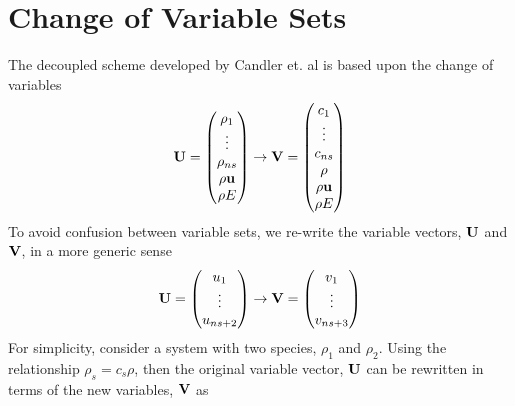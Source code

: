 \section{Change of Variable Sets}
\label{change-of-var-section}

The decoupled scheme developed by Candler et. al is based upon the change of
variables
\begin{equation}
  \mathbf U = \begin{pmatrix}
    \rho_1 \\
    \vdots \\
    \rho_{ns} \\
    \rho \mathbf u \\
    \rho E
  \end{pmatrix}
  \rightarrow
  \mathbf V = \begin{pmatrix}
    c_1 \\
    \vdots \\
    c_{ns} \\
    \rho \\
    \rho \mathbf u \\
    \rho E
  \end{pmatrix}
  \label{var-sets}
\end{equation}
To avoid confusion between variable sets, we re-write the variable vectors,
$\mathbf U$ and $\mathbf V$, in a more generic sense
\begin{equation}
  \mathbf U = \begin{pmatrix}
    u_1 \\
    \vdots \\
    u_{ns + 2}
  \end{pmatrix}
  \rightarrow
  \mathbf V = \begin{pmatrix}
    v_1 \\
    \vdots \\
    v_{ns + 3}
  \end{pmatrix}
  \label{generic-var-sets}
\end{equation}
For simplicity, consider a system with two species, $\rho_1$ and $\rho_2$.
Using the relationship $\rho_s = c_s \rho$, then the original variable vector,
$\mathbf U$ can be rewritten in terms of the new variables, $\mathbf V$ as
